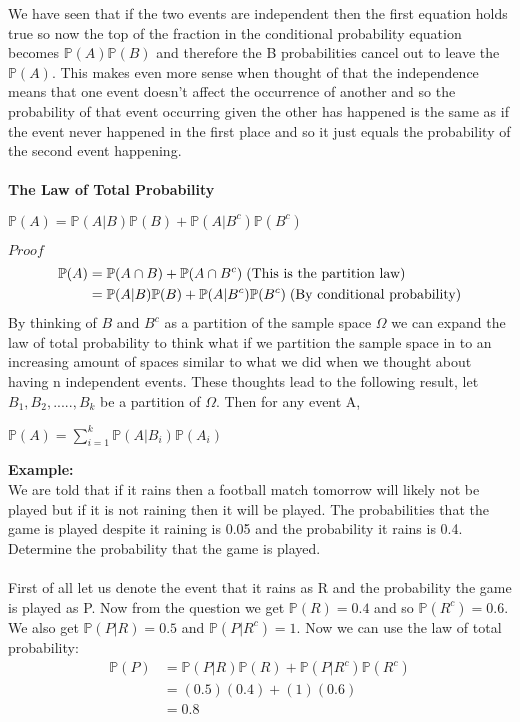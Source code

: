 \documentclass[,oneside]{article}
\begin{document}
\begin{enumerate}
\begin{center}
\end{center}
We have seen that if the two events are independent then the first equation holds true so now the top of the fraction in the conditional probability equation becomes $\mathbb{P}(A)\mathbb{P}(B)$ and therefore the B probabilities cancel out to leave the $\mathbb{P}(A)$. This makes even more sense when thought of that the independence means that one event doesn't affect the occurrence of another and so the probability of that event occurring given the other has happened is the same as if the event never happened in the first place and so it just equals the probability of the second event happening.  \\ \\
\textbf{The Law of Total Probability}\\
\begin{center}
$\mathbb{P}(A) = \mathbb{P}(A|B)\mathbb{P}(B)+\mathbb{P}(A|B^c)\mathbb{P}(B^c)$
\end{center}
$\textit{Proof}$
\begin{align*}
\mathbb{P}(A) &= \mathbb{P}(A\cap B)+\mathbb{P}(A\cap B^c) \hspace{0.1cm}\text{(This is the partition law)}\\
&=\mathbb{P}(A|B)\mathbb{P}(B)+\mathbb{P}(A|B^c)\mathbb{P}(B^c) \hspace{0.1cm}\text{(By conditional probability)}\\
\end{align*}
By thinking of $B$ and $B^c$ as a partition of the sample space $\Omega$ we can expand the law of total probability to think what if we partition the sample space in to an increasing amount of spaces similar to what we did when we thought about having n independent events. These thoughts lead to the following result, let $B_1, B_2,....., B_k$ be a partition of $\Omega$. Then for any event A,
\begin{center}
$\mathbb{P}(A)=\sum\limits_{i=1}^{k}\mathbb{P}(A|B_i)\mathbb{P}(A_i)$
\end{center}
\textbf{Example:}\\
We are told that if it rains then a football match tomorrow will likely not be played but if it is not raining then it will be played. The probabilities that the game is played despite it raining is 0.05 and the probability it rains is 0.4. Determine the probability that the game is played.\\
\\First of all let us denote the event that it rains as R and the probability the game is played as P. Now from the question we get $\mathbb{P}(R)=0.4$ and so $\mathbb{P}(R^c)=0.6$. We also get $\mathbb{P}(P|R)=0.5$ and $\mathbb{P}(P|R^c)=1$. Now we can use the law of total probability:
\begin{align*}
\mathbb{P}(P)&= \mathbb{P}(P|R)\mathbb{P}(R)+\mathbb{P}(P|R^c)\mathbb{P}(R^c)\\
&=(0.5)(0.4)+(1)(0.6)\\
&=0.8
\end{align*}


\end{enumerate}
\end{document}
